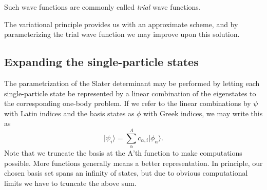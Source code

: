 Such wave functions are commonly called \emph{trial} wave functions. 

The variational principle provides us with an approximate scheme, and
by parameterizing the trial wave function we may improve upon this
solution.

\subsection{Expanding the single-particle states}

The parametrization of the Slater determinant may be performed by letting
each single-particle state be represented by a linear combination of
the eigenstates to the corresponding one-body problem. If we refer to
the linear combinations by $\psi$ with Latin indices and the basis
states as $\phi$ with Greek indices, we may write this as
\begin{equation}
\vert \psi_i \rangle = \sum_\alpha^A c_{\alpha,i} \vert \phi_{\alpha} \rangle .
\label{eqn:expanding_sp_states}
\end{equation}
Note that we truncate the basis at the A'th function to make
computations possible. More functions generally means a better
representation. In principle, our chosen basis set spans an infinity
of states, but due to obvious computational limits we have to truncate
the above sum.

